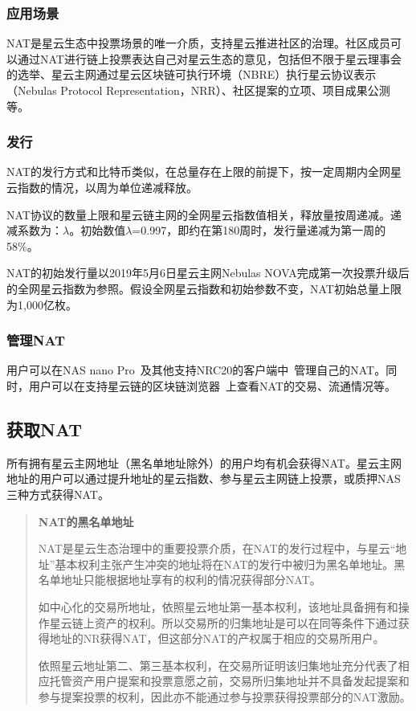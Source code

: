 \subsubsection{应用场景}

NAT是星云生态中投票场景的唯一介质，支持星云推进社区的治理。社区成员可以通过NAT进行链上投票表达自己对星云生态的意见，包括但不限于星云理事会的选举、星云主网通过星云区块链可执行环境（NBRE）执行星云协议表示（Nebulas Protocol Representation，NRR）、社区提案的立项、项目成果公测等。

\subsubsection{发行}
	
NAT的发行方式和比特币类似，在总量存在上限的前提下，按一定周期内全网星云指数的情况，以周为单位递减释放。

NAT协议的数量上限和星云链主网的全网星云指数值相关，释放量按周递减。递减系数为：$\lambda$。初始数值$\lambda$=0.997，即约在第180周时，发行量递减为第一周的58\%。

NAT的初始发行量以2019年5月6日星云主网Nebulas NOVA完成第一次投票升级后的全网星云指数为参照。假设全网星云指数和初始参数不变，NAT初始总量上限为1,000亿枚。

\subsubsection{管理NAT}

用户可以在NAS nano Pro~\cite{NASnano}及其他支持NRC20的客户端中~\cite{wallets}管理自己的NAT。同时，用户可以在支持星云链的区块链浏览器~\cite{explorer}上查看NAT的交易、流通情况等。

\subsection{获取NAT}

所有拥有星云主网地址（黑名单地址除外）的用户均有机会获得NAT。星云主网地址的用户可以通过提升地址的星云指数、参与星云主网链上投票，或质押NAS三种方式获得NAT。

\begin{quotation}

\textbf{NAT的黑名单地址}

NAT是星云生态治理中的重要投票介质，在NAT的发行过程中，与星云“地址”基本权利主张产生冲突的地址将在NAT的发行中被归为黑名单地址。黑名单地址只能根据地址享有的权利的情况获得部分NAT。

如中心化的交易所地址，依照星云地址第一基本权利，该地址具备拥有和操作星云链上资产的权利。所以交易所的归集地址是可以在同等条件下通过获得地址的NR获得NAT，但这部分NAT的产权属于相应的交易所用户。

依照星云地址第二、第三基本权利，在交易所证明该归集地址充分代表了相应托管资产用户提案和投票意愿之前，交易所归集地址并不具备发起提案和参与提案投票的权利，因此亦不能通过参与投票获得投票部分的NAT激励。

\end{quotation}

